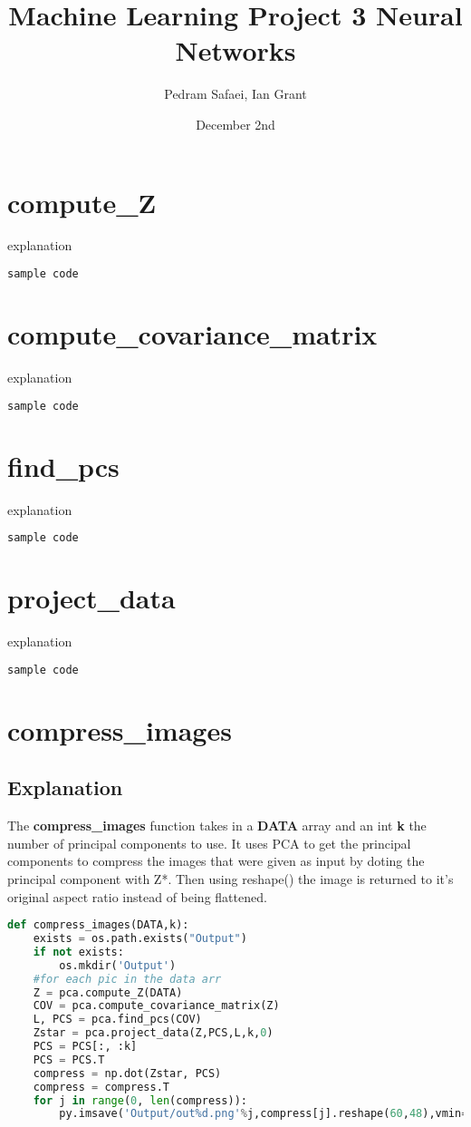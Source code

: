 \documentclass{article}
\title{Machine Learning Project 3 Neural Networks}
\author{Pedram Safaei, Ian Grant }
\date{December 2nd}
\begin{document}
\maketitle

\section{compute\_Z}
explanation
\begin{lstlisting}[language=Python]
sample code 
\end{lstlisting}


\section{compute\_covariance\_matrix}
explanation
\begin{lstlisting}[language=Python]
sample code 
\end{lstlisting}

\section{find\_pcs}
explanation
\begin{lstlisting}[language=Python]
sample code 
\end{lstlisting}

\section{project\_data}
explanation
\begin{lstlisting}[language=Python]
sample code 
\end{lstlisting}

\section{compress\_images}
\subsection{Explanation}
The \textbf{compress\_images} function takes in a \textbf{DATA} array and an int \textbf{k} the number of principal components to use. It uses PCA to get the principal components to compress the images that were given as input by doting the principal component with Z*. Then using reshape() the image is returned to it's original aspect ratio instead of being flattened. 
\begin{lstlisting}[language=Python]
def compress_images(DATA,k):
    exists = os.path.exists("Output")
    if not exists:
        os.mkdir('Output')
    #for each pic in the data arr
    Z = pca.compute_Z(DATA)
    COV = pca.compute_covariance_matrix(Z)
    L, PCS = pca.find_pcs(COV)
    Zstar = pca.project_data(Z,PCS,L,k,0)
    PCS = PCS[:, :k]
    PCS = PCS.T
    compress = np.dot(Zstar, PCS)
    compress = compress.T
    for j in range(0, len(compress)):
        py.imsave('Output/out%d.png'%j,compress[j].reshape(60,48),vmin=0,vmax=255,cmap='gray',format='png')
\end{lstlisting}
\end{document}
